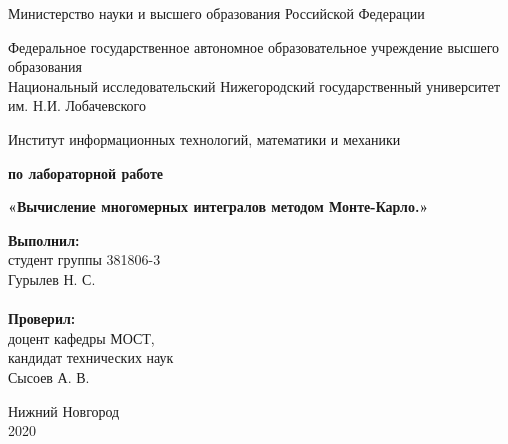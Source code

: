 \documentclass{report}
\begin{document}
\begin{titlepage}

\begin{center}
Министерство науки и высшего образования Российской Федерации
\end{center}

\begin{center}
Федеральное государственное автономное образовательное учреждение высшего образования \\
Национальный исследовательский Нижегородский государственный университет им. Н.И. Лобачевского
\end{center}

\begin{center}
Институт информационных технологий, математики и механики
\end{center}

\vspace{4em}

\begin{center}
\textbf{ по лабораторной работе} \\
\end{center}
\begin{center}
\textbf{\Large «Вычисление многомерных интегралов методом Монте-Карло.»}
\vspace{4em}
\end{center}
\newbox{\lbox}
\newlength{\maxl}
\setlength{\maxl}{\wd\lbox}
\hfill\parbox{7cm}{
\hspace*{5cm}\hspace*{-5cm}\textbf{Выполнил:} \\ студент группы 381806-3 \\ Гурылев Н. С.\\
\\
\hspace*{5cm}\hspace*{-5cm}\textbf{Проверил:}\\ доцент кафедры МОСТ, \\ кандидат технических наук \\ Сысоев А. В.\\
}
\vspace{\fill}

\begin{center} Нижний Новгород \\ 2020 \end{center}

\end{titlepage}
\end{document}

